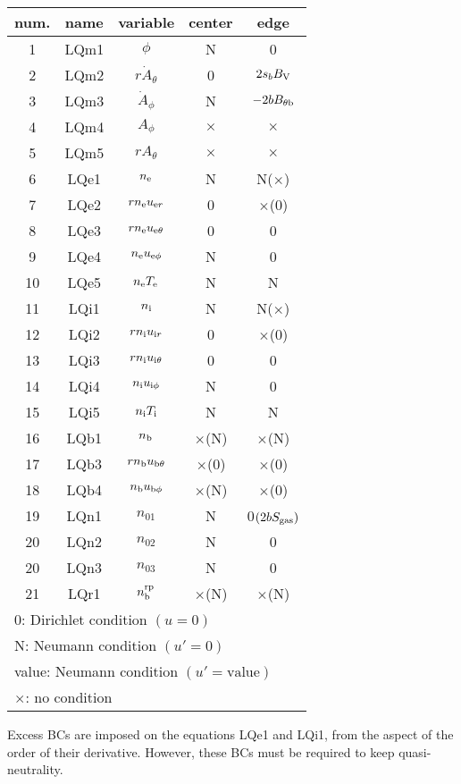 \documentclass[11pt]{article}
\def\r#1{{\rm#1}}
\def\nee{n_\r{e}}
\def\ni{n_\r{i}}
\def\nb{n_\r{b}}
\def\uer{u_{\r{e}r}}
\def\uir{u_{\r{i}r}}
\def\ueth{u_{\r{e}\theta}}
\def\uith{u_{\r{i}\theta}}
\def\ubth{u_{\r{b}\theta}}
\def\ueph{u_{\r{e}\phi}}
\def\uiph{u_{\r{i}\phi}}
\def\ubph{u_{\r{b}\phi}}
\def\Athd{\dot{A}_\theta}
\def\Aphd{\dot{A}_\phi}
\def\Ath{A_\theta}
\def\Aph{A_\phi}
\def\Te{T_\r{e}}
\def\Ti{T_\r{i}}
\def\nna{n_{01}}
\def\nnb{n_{02}}
\def\nnc{n_{03}}
\def\nbrp{n_\r{b}^\r{rp}}
\begin{document}
\begin{tabular}{|c|c|c|c|c|}\hline
 num. & name & variable       & center & edge \\\hline
 1    & LQm1 & $\phi$         & N        & 0\\
 2    & LQm2 & $r \Athd$      & 0        & $2s_b B_\r{V}$\\
 3    & LQm3 & $\Aphd$        & N        & $-2bB_{\theta\r{b}}$\\
 4    & LQm4 & $\Aph$         & $\times$ & $\times$\\
 5    & LQm5 & $r \Ath$       & $\times$ & $\times$\\
 6    & LQe1 & $\nee$         & N        & N($\times$)\\
 7    & LQe2 & $r \nee \uer$  & 0        & $\times$(0)\\
 8    & LQe3 & $r \nee \ueth$ & 0        & 0\\
 9    & LQe4 & $\nee \ueph$   & N        & 0\\
 10   & LQe5 & $\nee \Te$     & N        & N\\
 11   & LQi1 & $\ni$          & N        & N($\times$)\\
 12   & LQi2 & $r \ni \uir$   & 0        & $\times$(0)\\
 13   & LQi3 & $r \ni \uith$  & 0        & 0\\
 14   & LQi4 & $\ni \uiph$    & N        & 0\\
 15   & LQi5 & $\ni \Ti$      & N        & N\\
 16   & LQb1 & $\nb$          & $\times$(N) & $\times$(N)\\
 17   & LQb3 & $r \nb \ubth$  & $\times$(0) & $\times$(0)\\
 18   & LQb4 & $\nb \ubph$    & $\times$(N) & $\times$(0)\\
 19   & LQn1 & $\nna$         & N        & 0$(2bS_\r{gas})$\\
 20   & LQn2 & $\nnb$         & N        & 0\\
 20   & LQn3 & $\nnc$         & N        & 0\\
 21   & LQr1 & $\nbrp$        & $\times$(N) & $\times$(N)\\\hline
 \multicolumn{5}{l}{0: Dirichlet condition $(u=0)$}\\
 \multicolumn{5}{l}{N: Neumann condition $(u'=0)$}\\
 \multicolumn{5}{l}{value: Neumann condition $(u'=\mbox{value})$}\\
 \multicolumn{5}{l}{$\times$: no condition}
\end{tabular}

\medskip

Excess BCs are imposed on the equations LQe1 and LQi1, from the aspect
of the order of their derivative. However, these BCs must be required to
keep quasi-neutrality.
\end{document}
